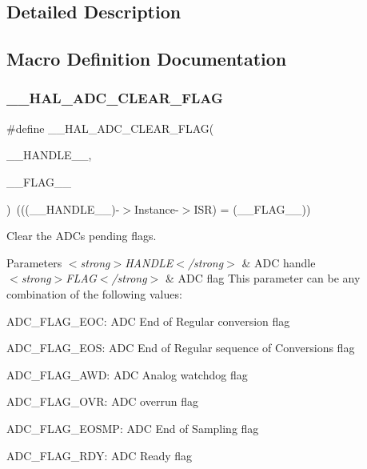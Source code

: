 \subsection{Detailed Description}


\subsection{Macro Definition Documentation}
\mbox{\label{group___a_d_c___exported___macros_gafe44e1e66141bca3665bb82981a81a17}} 
\subsubsection{\texorpdfstring{\+\_\+\+\_\+\+H\+A\+L\+\_\+\+A\+D\+C\+\_\+\+C\+L\+E\+A\+R\+\_\+\+F\+L\+AG}{\_\_HAL\_ADC\_CLEAR\_FLAG}}
{\footnotesize\ttfamily \#define \+\_\+\+\_\+\+H\+A\+L\+\_\+\+A\+D\+C\+\_\+\+C\+L\+E\+A\+R\+\_\+\+F\+L\+AG(\begin{DoxyParamCaption}\item[{}]{\+\_\+\+\_\+\+H\+A\+N\+D\+L\+E\+\_\+\+\_\+,  }\item[{}]{\+\_\+\+\_\+\+F\+L\+A\+G\+\_\+\+\_\+ }\end{DoxyParamCaption})~(((\+\_\+\+\_\+\+H\+A\+N\+D\+L\+E\+\_\+\+\_\+)-\/$>$Instance-\/$>$I\+SR) = (\+\_\+\+\_\+\+F\+L\+A\+G\+\_\+\+\_\+))}



Clear the A\+DC\textquotesingle{}s pending flags. 


\begin{DoxyParams}{Parameters}
{\em $<$strong$>$\+H\+A\+N\+D\+L\+E$<$/strong$>$} & A\+DC handle \\
\hline
{\em $<$strong$>$\+F\+L\+A\+G$<$/strong$>$} & A\+DC flag This parameter can be any combination of the following values\+: \begin{DoxyItemize}
\item A\+D\+C\+\_\+\+F\+L\+A\+G\+\_\+\+E\+OC\+: A\+DC End of Regular conversion flag \item A\+D\+C\+\_\+\+F\+L\+A\+G\+\_\+\+E\+OS\+: A\+DC End of Regular sequence of Conversions flag \item A\+D\+C\+\_\+\+F\+L\+A\+G\+\_\+\+A\+WD\+: A\+DC Analog watchdog flag \item A\+D\+C\+\_\+\+F\+L\+A\+G\+\_\+\+O\+VR\+: A\+DC overrun flag \item A\+D\+C\+\_\+\+F\+L\+A\+G\+\_\+\+E\+O\+S\+MP\+: A\+DC End of Sampling flag \item A\+D\+C\+\_\+\+F\+L\+A\+G\+\_\+\+R\+DY\+: A\+DC Ready flag \end{DoxyItemize}
\\
\hline
\end{DoxyParams}

